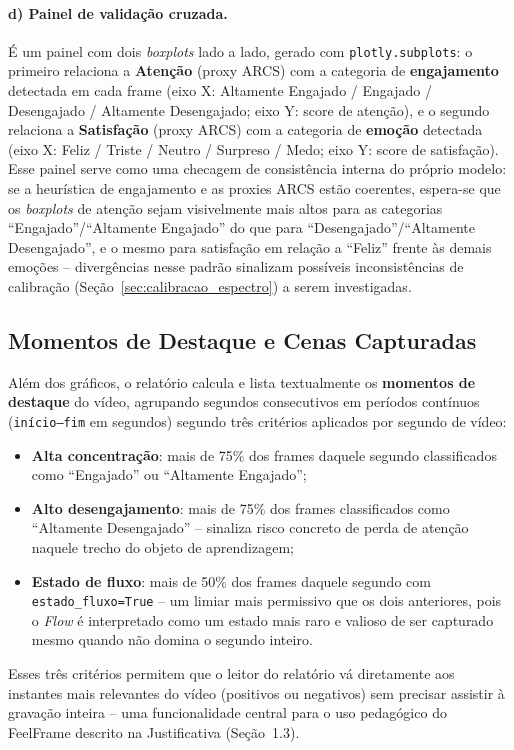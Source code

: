 \documentclass[
	12pt,
	openright,
	oneside,
	a4paper,
	english,
	brazil
	]{abntex2}
\begin{document}
\paragraph{d) Painel de validação cruzada.}
É um painel com dois \textit{boxplots} lado a lado, gerado com \texttt{plotly.subplots}: o primeiro relaciona a \textbf{Atenção} (proxy ARCS) com a categoria de \textbf{engajamento} detectada em cada frame (eixo X: Altamente Engajado / Engajado / Desengajado / Altamente Desengajado; eixo Y: score de atenção), e o segundo relaciona a \textbf{Satisfação} (proxy ARCS) com a categoria de \textbf{emoção} detectada (eixo X: Feliz / Triste / Neutro / Surpreso / Medo; eixo Y: score de satisfação). Esse painel serve como uma checagem de consistência interna do próprio modelo: se a heurística de engajamento e as proxies ARCS estão coerentes, espera-se que os \textit{boxplots} de atenção sejam visivelmente mais altos para as categorias ``Engajado''/``Altamente Engajado'' do que para ``Desengajado''/``Altamente Desengajado'', e o mesmo para satisfação em relação a ``Feliz'' frente às demais emoções -- divergências nesse padrão sinalizam possíveis inconsistências de calibração (Seção~\ref{sec:calibracao_espectro}) a serem investigadas.

\subsection{Momentos de Destaque e Cenas Capturadas}

Além dos gráficos, o relatório calcula e lista textualmente os \textbf{momentos de destaque} do vídeo, agrupando segundos consecutivos em períodos contínuos (\texttt{início--fim} em segundos) segundo três critérios aplicados por segundo de vídeo:
\begin{itemize}
    \item \textbf{Alta concentração}: mais de 75\% dos frames daquele segundo classificados como ``Engajado'' ou ``Altamente Engajado'';
    \item \textbf{Alto desengajamento}: mais de 75\% dos frames classificados como ``Altamente Desengajado'' -- sinaliza risco concreto de perda de atenção naquele trecho do objeto de aprendizagem;
    \item \textbf{Estado de fluxo}: mais de 50\% dos frames daquele segundo com \texttt{estado\_fluxo=True} -- um limiar mais permissivo que os dois anteriores, pois o \textit{Flow} \cite{csikszentmihalyi1990flow} é interpretado como um estado mais raro e valioso de ser capturado mesmo quando não domina o segundo inteiro.
\end{itemize}
Esses três critérios permitem que o leitor do relatório vá diretamente aos instantes mais relevantes do vídeo (positivos ou negativos) sem precisar assistir à gravação inteira -- uma funcionalidade central para o uso pedagógico do FeelFrame descrito na Justificativa (Seção~1.3).
\end{document}
